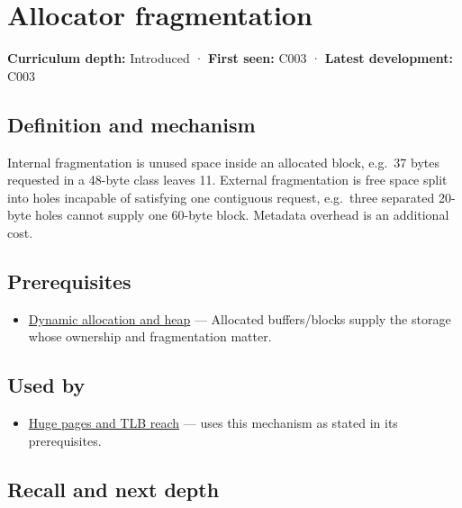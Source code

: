 \hypertarget{appendix-a7c50686d81f}{}
\section{Allocator fragmentation}\label{appendix-a7c50686d81f-allocator-fragmentation}

\textbf{Curriculum depth:} Introduced · \textbf{First seen:} C003 · \textbf{Latest development:} C003

\subsection{Definition and mechanism}\label{appendix-a7c50686d81f-definition-and-mechanism}

Internal fragmentation is unused space inside an allocated block, e.g.~37 bytes requested in a 48-byte class leaves 11. External fragmentation is free space split into holes incapable of satisfying one contiguous request, e.g.~three separated 20-byte holes cannot supply one 60-byte block. Metadata overhead is an additional cost.

\subsection{Prerequisites}\label{appendix-a7c50686d81f-prerequisites}

\begin{itemize}
\tightlist
\item
  \hyperref[appendix-c3480f7d9ff3]{Dynamic allocation and heap} --- Allocated buffers/blocks supply the storage whose ownership and fragmentation matter.
\end{itemize}

\subsection{Used by}\label{appendix-a7c50686d81f-used-by}

\begin{itemize}
\tightlist
\item
  \hyperref[appendix-ce688d1acdab]{Huge pages and TLB reach} --- uses this mechanism as stated in its prerequisites.
\end{itemize}

\subsection{Recall and next depth}\label{appendix-a7c50686d81f-recall-and-next-depth}

